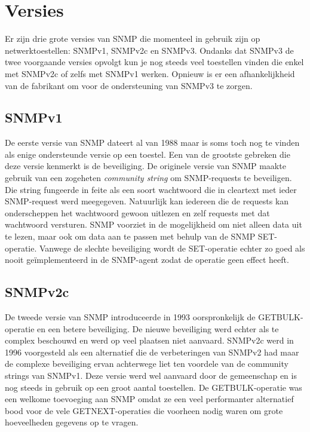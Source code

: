 \section{Versies}
\label{snmp-versies}
Er zijn drie grote versies van SNMP die momenteel in gebruik zijn op netwerktoestellen: SNMPv1, SNMPv2c en SNMPv3.
Ondanks dat SNMPv3 de twee voorgaande versies opvolgt kun je nog steeds veel toestellen vinden die enkel met SNMPv2c of zelfs met SNMPv1 werken.
Opnieuw is er een afhankelijkheid van de fabrikant om voor de ondersteuning van SNMPv3 te zorgen.


\subsection{SNMPv1}
De eerste versie van SNMP dateert al van 1988 maar is soms toch nog te vinden als enige ondersteunde versie op een toestel.
Een van de grootste gebreken die deze versie kenmerkt is de beveiliging.
De originele versie van SNMP maakte gebruik van een zogeheten \emph{community string} om SNMP-requests te beveiligen.
Die string fungeerde in feite als een soort wachtwoord die in cleartext met ieder SNMP-request werd meegegeven\cite{snmp-wiki}.
Natuurlijk kan iedereen die de requests kan onderscheppen het wachtwoord gewoon uitlezen en zelf requests met dat wachtwoord versturen.
SNMP voorziet in de mogelijkheid om niet alleen data uit te lezen, maar ook om data aan te passen met behulp van de SNMP SET-operatie.
Vanwege de slechte beveiliging wordt de SET-operatie echter zo goed als nooit geïmplementeerd in de SNMP-agent zodat de operatie geen effect heeft.



\subsection{SNMPv2c}
De tweede versie van SNMP introduceerde in 1993 \cite{snmp-versions} oorspronkelijk de GETBULK-operatie en een betere beveiliging.
De nieuwe beveiliging werd echter als te complex beschouwd en werd op veel plaatsen niet aanvaard.
SNMPv2c werd in 1996 \cite{snmp-versions} voorgesteld als een alternatief die de verbeteringen van SNMPv2 had maar de complexe beveiliging ervan achterwege liet
ten voordele van de community strings van SNMPv1.
Deze versie werd wel aanvaard door de gemeenschap en is nog steeds in gebruik op een groot aantal toestellen.
De GETBULK-operatie was een welkome toevoeging aan SNMP omdat ze een veel performanter alternatief bood voor de vele GETNEXT-operaties
die voorheen nodig waren om grote hoeveelheden gegevens op te vragen.

